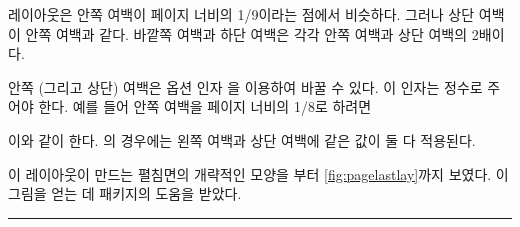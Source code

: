 \cmd{\semiisopage} 레이아웃은 안쪽 여백이 페이지 너비의 1/9이라는 점에서
비슷하다. 그러나 상단 여백이 안쪽 여백과 같다. 바깥쪽 여백과 하단 여백은 각각
안쪽 여백과 상단 여백의 2배이다.

안쪽 (그리고 상단) 여백은 옵션 인자 을 이용하여 바꿀 수 있다.
이 인자는 정수로 주어야 한다. 예를 들어 안쪽 여백을 페이지 너비의 1/8로 하려면
\begin{lcode}
\semiisopage[8]%
\end{lcode}
이와 같이 한다. \cmd{\isopage}의 경우에는 왼쪽 여백과 상단 여백에 
같은 값이 둘 다 적용된다.

이 레이아웃이 만드는 펼침면의 개략적인 모양을 부터
\ref{fig:pagelastlay}까지 보였다. 이 그림을 얻는 데  패키지의
도움을 받았다.

\fancybreak{}

